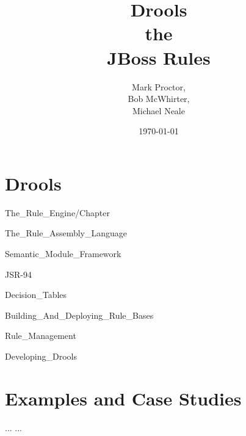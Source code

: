 \documentclass[14pt]{book}
\begin{document}
\title{\Huge\bf Drools\\ the\\ JBoss Rules}
\author{Mark Proctor,\\ 
       Bob McWhirter,\\ 
       Michael Neale}
\date{\today}
\maketitle

\tableofcontents

\part {Drools}

 {The_Rule_Engine/Chapter}

 {The_Rule_Assembly_Language}

 {Semantic_Module_Framework}

 {JSR-94}

 {Decision_Tables}

 {Building_And_Deploying_Rule_Bases}

 {Rule_Management}

 {Developing_Drools}

\part {Examples and Case Studies}

\begin{thebibliography}{99}
 ...
 ...
\end{thebibliography}

\printindex
\end{document}

